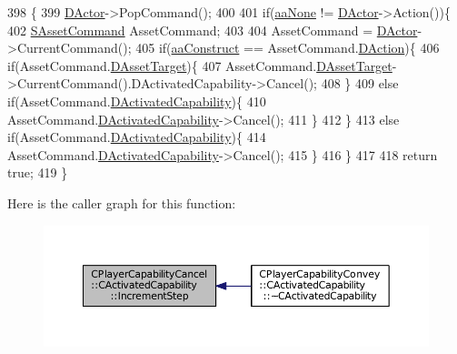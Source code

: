 \begin{DoxyCode}
398                                                                \{
399     \hyperlink{classCActivatedPlayerCapability_a54ca944b47bff2718330639941d402b0}{DActor}->PopCommand();
400     
401     \textcolor{keywordflow}{if}(\hyperlink{GameDataTypes_8h_ab47668e651a3032cfb9c40ea2d60d670ac17cc5a0035320c060d7f8074143b507}{aaNone} != \hyperlink{classCActivatedPlayerCapability_a54ca944b47bff2718330639941d402b0}{DActor}->Action())\{
402         \hyperlink{structSAssetCommand}{SAssetCommand} AssetCommand;
403         
404         AssetCommand = \hyperlink{classCActivatedPlayerCapability_a54ca944b47bff2718330639941d402b0}{DActor}->CurrentCommand();
405         \textcolor{keywordflow}{if}(\hyperlink{GameDataTypes_8h_ab47668e651a3032cfb9c40ea2d60d670a7ef6b863f66dd7dcc95a199cd758ae1d}{aaConstruct} == AssetCommand.\hyperlink{structSAssetCommand_a8edd3b3d59a76d5514ba403bc8076a75}{DAction})\{
406             \textcolor{keywordflow}{if}(AssetCommand.\hyperlink{structSAssetCommand_a3d9b43f6e59c386c48c41a65448a0c39}{DAssetTarget})\{
407                 AssetCommand.\hyperlink{structSAssetCommand_a3d9b43f6e59c386c48c41a65448a0c39}{DAssetTarget}->CurrentCommand().DActivatedCapability->Cancel();
408             \}
409             \textcolor{keywordflow}{else} \textcolor{keywordflow}{if}(AssetCommand.\hyperlink{structSAssetCommand_ad8beda19520811cc70fe1eab16c774dd}{DActivatedCapability})\{
410                 AssetCommand.\hyperlink{structSAssetCommand_ad8beda19520811cc70fe1eab16c774dd}{DActivatedCapability}->Cancel();
411             \}
412         \}
413         \textcolor{keywordflow}{else} \textcolor{keywordflow}{if}(AssetCommand.\hyperlink{structSAssetCommand_ad8beda19520811cc70fe1eab16c774dd}{DActivatedCapability})\{
414             AssetCommand.\hyperlink{structSAssetCommand_ad8beda19520811cc70fe1eab16c774dd}{DActivatedCapability}->Cancel();
415         \}
416     \}
417     
418     \textcolor{keywordflow}{return} \textcolor{keyword}{true};
419 \}
\end{DoxyCode}
Here is the caller graph for this function\+:
\nopagebreak
\begin{figure}[H]
\begin{center}
\leavevmode
\includegraphics[width=350pt]{classCPlayerCapabilityCancel_1_1CActivatedCapability_a28351293b3a662bca20a2d666b8801e1_icgraph}
\end{center}
\end{figure}
